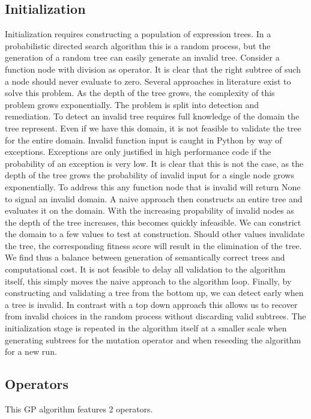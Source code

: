\documentclass[10pt]{extarticle}
\begin{document}
\subsection{Initialization}
Initialization requires constructing a population of expression trees. In a probabilistic directed search algorithm this is a random process, but the generation of a random tree can easily generate an invalid tree. Consider a function node with division as operator. It is clear that the right subtree of such a node should never evaluate to zero. 
Several approaches in literature exist %
to solve this problem.
As the depth of the tree grows, the complexity of this problem grows exponentially.
The problem is split into detection and remediation.
To detect an invalid tree requires full knowledge of the domain the tree represent. Even if we have this domain, it is not feasible to validate the tree for the entire domain. 
Invalid function input is caught in Python by way of exceptions. 
Exceptions are only justified in high performance code if the probability of an exception is very low. 
It is clear that this is not the case, as the depth of the tree grows the probability of invalid input for a single node grows exponentially. To address this any function node that is invalid will return None to signal an invalid domain.
A naive approach then constructs an entire tree and evaluates it on the domain. 
With the increasing propability of invalid nodes as the depth of the tree increases, this becomes quickly infeasible.
We can constrict the domain to a few values to test at construction. 
Should other values invalidate the tree, the corresponding fitness score will result in the elimination of the tree.
We find thus a balance between generation of semantically correct trees and computational cost. 
It is not feasible to delay all validation to the algorithm itself, this simply moves the naive approach to the algorithm loop.
Finally, by constructing and validating a tree from the bottom up, we can detect early when a tree is invalid. 
In contrast with a top down approach this allows us to recover from invalid choices in the random process without discarding valid subtrees.
The initialization stage is repeated in the algorithm itself at a smaller scale when generating subtrees for the mutation operator and when reseeding the algorithm for a new run.

\subsection{Operators}
This GP algorithm features 2 operators.
\end{document}

